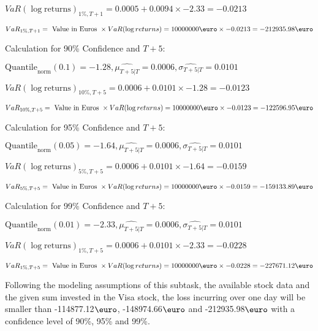 \indent\indent $VaR(\log \text{returns})_{1\%, T + 1} = 0.0005 + 0.0094\times-2.33 = -0.0213$

\indent\indent $VaR_{1\%, T + 1} = \text{ Value in Euros } \times VaR(\log returns) = 10 000 000 \text{\euro} \times-0.0213 = -212935.98 \text{\euro}$\newline




Calculation for 90\% Confidence and $T+5$:

\indent\indent $\text{Quantile}_\text{norm}(0.1) = -1.28,\hat{\mu_{T+5|T}} = 0.0006, \hat{\sigma_{T+5|T}} = 0.0101$

\indent\indent $VaR(\log \text{returns})_{10\%, T + 5} = 0.0006 + 0.0101\times-1.28 = -0.0123$

\indent\indent $VaR_{10\%, T + 5} = \text{ Value in Euros } \times VaR(\log returns) = 10 000 000 \text{\euro} \times-0.0123 = -122596.95 \text{\euro}$\newline




Calculation for 95\% Confidence and $T+5$:

\indent\indent $\text{Quantile}_\text{norm}(0.05) = -1.64,\hat{\mu_{T+5|T}} = 0.0006, \hat{\sigma_{T+5|T}} = 0.0101$

\indent\indent $VaR(\log \text{returns})_{5\%, T + 5} = 0.0006 + 0.0101\times-1.64 = -0.0159$

\indent\indent $VaR_{5\%, T + 5} = \text{ Value in Euros } \times VaR(\log returns) = 10 000 000 \text{\euro} \times-0.0159 = -159133.89 \text{\euro}$\newline




Calculation for 99\% Confidence and $T+5$:

\indent\indent $\text{Quantile}_\text{norm}(0.01) = -2.33,\hat{\mu_{T+5|T}} = 0.0006, \hat{\sigma_{T+5|T}} = 0.0101$

\indent\indent $VaR(\log \text{returns})_{1\%, T + 5} = 0.0006 + 0.0101\times-2.33 = -0.0228$

\indent\indent $VaR_{1\%, T + 5} = \text{ Value in Euros } \times VaR(\log returns) = 10 000 000 \text{\euro} \times-0.0228 = -227671.12 \text{\euro}$\newline


Following the modeling assumptions of this subtask, the available stock data and the given sum invested in the Visa stock, the loss incurring over one day will be smaller than -114877.12$\text{\euro}$, -148974.66$\text{\euro}$  and -212935.98$\text{\euro}$  with a confidence level of 90\%, 95\%  and 99\%.

